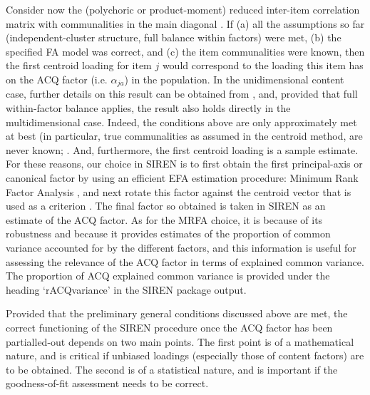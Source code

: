 Consider now the (polychoric or product-moment) reduced inter-item correlation matrix with communalities in the main diagonal \citep[see][]{Ferrando:2010}. If (a) all the assumptions so far (independent-cluster structure, full balance within factors) were met, (b) the specified FA model was correct, and (c) the item communalities were known, then the first centroid loading \citep[e.g.][]{Lawley:1960} for item $j$ would correspond to the loading this item has on the ACQ factor (i.e. $\alpha_{ja}$) in the population. In the unidimensional content case, further details on this result can be obtained from \citet{Ferrando:2003}, and, provided that full within-factor balance applies, the result also holds directly in the multidimensional case. Indeed, the conditions above are only approximately met at best (in particular, true communalities as assumed in the centroid method, are never known; \citep[see][]{McDonald:1978}. And, furthermore, the first centroid loading is a sample estimate. For these reasons, our choice in SIREN is to first obtain the first principal-axis or canonical factor by using an efficient EFA estimation procedure: Minimum Rank Factor Analysis \citep[MRFA,][]{tenBerge:1991}, and next rotate this factor against the centroid vector that is used as a criterion \citep[see][]{Eysenck:1950}. The final factor so obtained is taken in SIREN as an estimate of the ACQ factor. As for the MRFA choice, it is because of its robustness and because it provides estimates of the proportion of common variance accounted for by the different factors, and this information is useful for assessing the relevance of the ACQ factor in terms of explained common variance. The proportion of ACQ explained common variance is provided under the heading ‘rACQvariance’ in the SIREN package output.

Provided that the preliminary general conditions discussed above are met, the correct functioning of the SIREN procedure once the ACQ factor has been partialled-out depends on two main points. The first point is of a mathematical nature, and is critical if unbiased loadings (especially those of content factors) are to be obtained. The second is of a statistical nature, and is important if the goodness-of-fit assessment needs to be correct.

